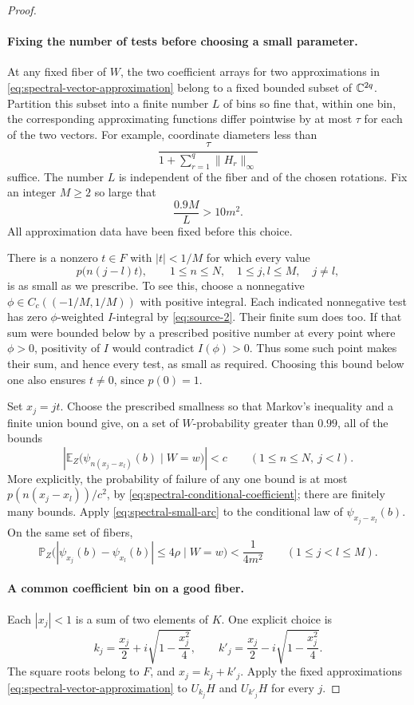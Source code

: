 \begin{proof}
\paragraph{Fixing the number of tests before choosing a small parameter.}
At any fixed fiber of $W$, the two coefficient arrays for two
approximations in \eqref{eq:spectral-vector-approximation} belong to
a fixed bounded subset of $\mathbb C^{2q}$. Partition this subset into a
finite number $L$ of bins so fine that, within one bin, the corresponding
approximating functions differ pointwise by at most $\tau$ for each
of the two vectors. For example, coordinate diameters less than
\[
 \frac{\tau}{1+\sum_{r=1}^q\|H_r\|_\infty}
\]
suffice. The number $L$ is independent of the fiber and of the chosen
rotations. Fix an integer $M\ge2$ so large that
\[
 \frac{0.9M}{L}>10m^2.
\]
All approximation data have been fixed before this choice.

There is a nonzero $t\in F$ with $|t|<1/M$ for which every value
\[
 p\bigl(n(j-l)t\bigr),\qquad
 1\le n\le N,\quad 1\le j,l\le M,\quad j\ne l,
\]
is as small as we prescribe. To see this, choose a nonnegative
$\phi\in C_c((-1/M,1/M))$ with positive integral. Each indicated
nonnegative test has zero $\phi$-weighted $I$-integral by
\eqref{eq:source-2}. Their finite sum does too. If that sum were
bounded below by a prescribed positive number at every point where
$\phi>0$, positivity of $I$ would contradict $I(\phi)>0$. Thus some
such point makes their sum, and hence every test, as small as required.
Choosing this bound below one also ensures $t\ne0$, since $p(0)=1$.

Set $x_j=jt$. Choose the prescribed smallness so that Markov's
inequality and a finite union bound give, on a set of $W$-probability
greater than $0.99$, all of the bounds
\[
 \left|\mathbb E_Z\bigl(\psi_{n(x_j-x_l)}(b)\mid W=w\bigr)\right|<c
 \qquad(1\le n\le N,\ j<l).
\]
More explicitly, the probability of failure of any one bound is at
most $p(n(x_j-x_l))/c^2$, by
\eqref{eq:spectral-conditional-coefficient}; there are finitely many
bounds. Apply \eqref{eq:spectral-small-arc} to the conditional law
of $\psi_{x_j-x_l}(b)$. On the same set of fibers,
\begin{equation}\label{eq:source-5}
 \mathbb P_Z\bigl(
   |\psi_{x_j}(b)-\psi_{x_l}(b)|\le4\rho\mid W=w
                  \bigr)<\frac1{4m^2}
 \qquad(1\le j<l\le M).
\end{equation}

\paragraph{A common coefficient bin on a good fiber.}
Each $|x_j|<1$ is a sum of two elements of $K$. One explicit choice is
\[
 k_j=\frac{x_j}{2}+i\sqrt{1-\frac{x_j^2}{4}},\qquad
 k'_j=\frac{x_j}{2}-i\sqrt{1-\frac{x_j^2}{4}}.
\]
The square roots belong to $F$, and $x_j=k_j+k'_j$. Apply the fixed
approximations \eqref{eq:spectral-vector-approximation} to
$U_{k_j}H$ and $U_{k'_j}H$ for every $j$.


\end{proof}
